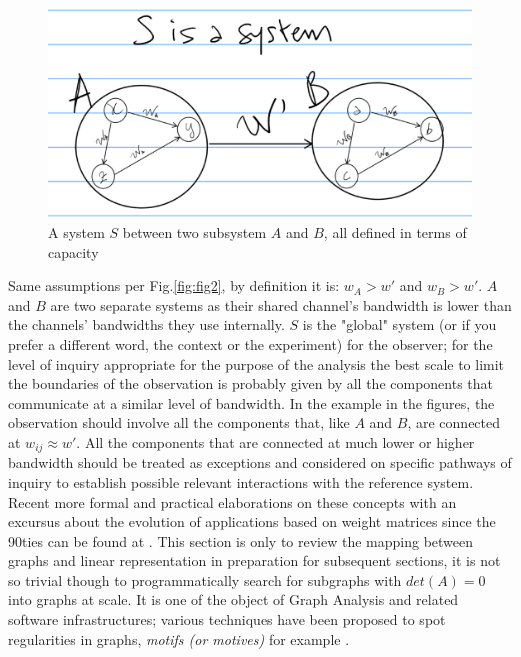 \documentclass[14pt]{extarticle}
\begin{document}
\begin{figure}[htbp]
\begin{minipage}[t]{0.90\linewidth}
    \includegraphics[width=\linewidth]{Fig__3_a_system-2.eps}
	\caption{A system \(S\) between two subsystem \(A\) and \(B\), all defined in terms of capacity}%
	\label{fig:fig3}
\end{minipage}%
\end{figure}

Same assumptions per Fig.\ref{fig:fig2}, by definition it is: \(w_A > w'\)  and  \(w_B > w'\). \(A\) and \(B\) are two separate systems as their shared channel's bandwidth is lower than the channels' bandwidths they use internally. \(S\) is the "global" system (or if you prefer a different word, the context or the experiment) for the observer; for the level of inquiry appropriate for the purpose of the analysis the best scale to limit the boundaries of the observation is probably given by all the components that communicate at a similar level of bandwidth. In the example in the figures, the observation should involve all the components that, like \(A\) and \(B\), are connected at \(w_{ij} \approx w'\). All the components that are connected at much lower or higher bandwidth should be treated as exceptions and considered on specific pathways of inquiry to establish possible relevant interactions with the reference system.
\newline
Recent more formal and practical elaborations on these concepts with an excursus about the evolution of applications based on weight matrices since the 90ties can be found at \cite{KAZUKIselfrefweights}.
\newline
This section is only to review the mapping between graphs and linear representation in preparation for subsequent sections, it is not so trivial though to programmatically search for subgraphs with \(det(A) = 0\) into graphs at scale. It is one of the object of Graph Analysis and related software infrastructures; various techniques have been proposed to spot regularities in graphs, \textit{motifs (or motives)} for example \cite{schreiber2004towards}.
\end{document}
